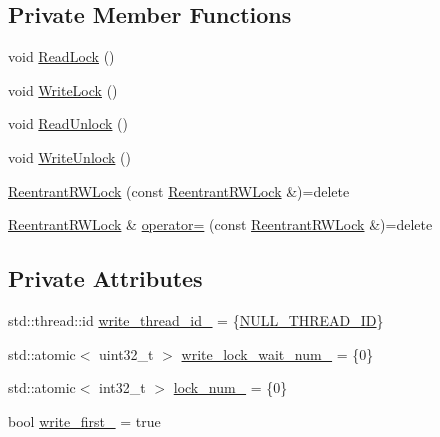 \subsection*{Private Member Functions}
\begin{DoxyCompactItemize}
\item 
void \hyperlink{classapollo_1_1cyber_1_1base_1_1ReentrantRWLock_a8549e924ba3f76d1fb517f736a358d64}{Read\-Lock} ()
\item 
void \hyperlink{classapollo_1_1cyber_1_1base_1_1ReentrantRWLock_a02f8bf0029382f9887e7e3f9c8c3051a}{Write\-Lock} ()
\item 
void \hyperlink{classapollo_1_1cyber_1_1base_1_1ReentrantRWLock_a07699e427dcd60975968712cdfd9bf0b}{Read\-Unlock} ()
\item 
void \hyperlink{classapollo_1_1cyber_1_1base_1_1ReentrantRWLock_af8f6e3508b02328dcc081d72639097f4}{Write\-Unlock} ()
\item 
\hyperlink{classapollo_1_1cyber_1_1base_1_1ReentrantRWLock_a9669ea9047b7b86ed6093fbe149fa833}{Reentrant\-R\-W\-Lock} (const \hyperlink{classapollo_1_1cyber_1_1base_1_1ReentrantRWLock}{Reentrant\-R\-W\-Lock} \&)=delete
\item 
\hyperlink{classapollo_1_1cyber_1_1base_1_1ReentrantRWLock}{Reentrant\-R\-W\-Lock} \& \hyperlink{classapollo_1_1cyber_1_1base_1_1ReentrantRWLock_ac2862d650cda15e8c6a553ce5fe5ce66}{operator=} (const \hyperlink{classapollo_1_1cyber_1_1base_1_1ReentrantRWLock}{Reentrant\-R\-W\-Lock} \&)=delete
\end{DoxyCompactItemize}
\subsection*{Private Attributes}
\begin{DoxyCompactItemize}
\item 
std\-::thread\-::id \hyperlink{classapollo_1_1cyber_1_1base_1_1ReentrantRWLock_ad9ffc19935a572a671f094c612581473}{write\-\_\-thread\-\_\-id\-\_\-} = \{\hyperlink{namespaceapollo_1_1cyber_1_1base_a3aa2d654ab213ffe2d37fd81e951094b}{N\-U\-L\-L\-\_\-\-T\-H\-R\-E\-A\-D\-\_\-\-I\-D}\}
\item 
std\-::atomic$<$ uint32\-\_\-t $>$ \hyperlink{classapollo_1_1cyber_1_1base_1_1ReentrantRWLock_a374944a50ed1bb9997bfd1665ae7c3fc}{write\-\_\-lock\-\_\-wait\-\_\-num\-\_\-} = \{0\}
\item 
std\-::atomic$<$ int32\-\_\-t $>$ \hyperlink{classapollo_1_1cyber_1_1base_1_1ReentrantRWLock_a5ca32abf747615ddcd8d52d46ad434db}{lock\-\_\-num\-\_\-} = \{0\}
\item 
bool \hyperlink{classapollo_1_1cyber_1_1base_1_1ReentrantRWLock_ab986769842dcde3e2dc152ee206bd16a}{write\-\_\-first\-\_\-} = true
\end{DoxyCompactItemize}
